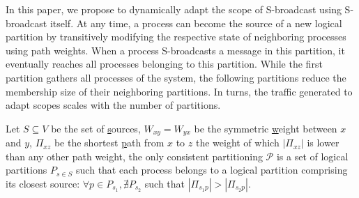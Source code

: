 
In this paper, we propose to dynamically adapt the scope of
S-broadcast using S-broadcast itself. At any time, a process can
become the source of a new logical partition by transitively modifying
the respective state of neighboring processes using path weights. When
a process S-broadcasts a message in this partition, it eventually
reaches all processes belonging to this partition.  While the first
partition gathers all processes of the system, the following
partitions reduce the membership size of their neighboring
partitions. In turns, the traffic generated to adapt scopes scales
with the number of partitions. 

\begin{definition}
  Let $S \subseteq V$ be the set of \underline{s}ources, $W_{xy} =
  W_{yx}$ be the symmetric \underline{w}eight between $x$ and $y$,
  $\Pi_{xz}$ be the shortest \underline{p}ath from $x$ to $z$ the
  weight of which $|\Pi_{xz}|$ is lower than any other path weight,
  the only consistent partitioning $\mathcal{P}$ is a set of logical
  partitions $P_{s\in S}$ such that each process belongs to a logical
  partition comprising its closest source: $\forall p \in P_{s_1},
  \nexists P_{s_2}$ such that $|\Pi_{s_1p}| > |\Pi_{s_2p}|$.
\end{definition}


